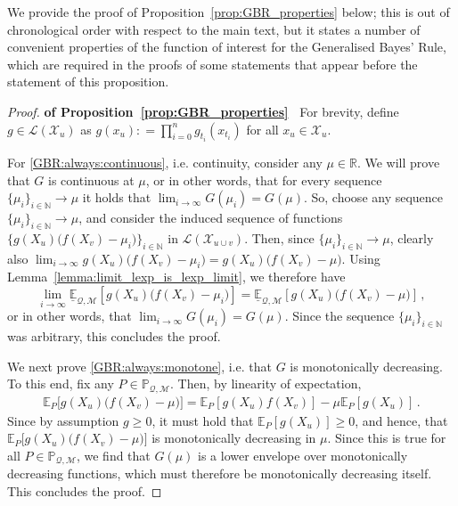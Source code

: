 \documentclass[twoside,11pt]{article}
\newcommand{\nats}{\mathbb{N}}
\newcommand{\reals}{\mathbb{R}}
\newcommand{\states}{\mathcal{X}}
\newcommand{\lexp}{\underline{\mathbb{E}}_{\rateset,\mathcal{M}}}
\newcommand{\gambles}{\mathcal{L}}
\newcommand{\rateset}{\mathcal{Q}}
\newcommand{\coloneqq}{:\!=}
\begin{document}
We provide the proof of Proposition~\ref{prop:GBR_properties} below; this is out of chronological order with respect to the main text, but it states a number of convenient properties of the function of interest for the Generalised Bayes' Rule, which are required in the proofs of some statements that appear before the statement of this proposition.

\begin{proof}{\bf of Proposition~\ref{prop:GBR_properties}~}
For brevity, define $g\in\gambles(\states_u)$ as $g(x_u)\coloneqq \prod_{i=0}^n g_{t_i}(x_{t_i})$ for all $x_u\in\states_u$.

For \ref{GBR:always:continuous}, i.e. continuity, consider any $\mu\in\reals$. We will prove that $G$ is continuous at $\mu$, or in other words, that for every sequence $\{\mu_i\}_{i\in\nats}\to\mu$ it holds that $\lim_{i\to\infty}G(\mu_i)=G(\mu)$. So, choose any sequence $\{\mu_i\}_{i\in\nats}\to\mu$, and consider the induced sequence of functions $\bigl\{g(X_u)\bigl(f(X_v) - \mu_i\bigr)\bigr\}_{i\in\nats}$ in $\gambles(\states_{u\cup v})$. Then, since $\{\mu_i\}_{i\in\nats}\to\mu$, clearly also $\lim_{i\to\infty}g(X_u)\bigl(f(X_v) - \mu_i\bigr)=g(X_u)\bigl(f(X_v) - \mu\bigr)$. Using Lemma~\ref{lemma:limit_lexp_is_lexp_limit}, we therefore have
\begin{equation*}
\lim_{i\to\infty}\lexp[g(X_u)\bigl(f(X_v) - \mu_i\bigr)] = \lexp[g(X_u)\bigl(f(X_v) - \mu\bigr)]\,,
\end{equation*}
or in other words, that $\lim_{i\to\infty}G(\mu_i) = G(\mu)$. Since the sequence $\{\mu_i\}_{i\in\nats}$ was arbitrary, this concludes the proof.

We next prove \ref{GBR:always:monotone}, i.e. that $G$ is monotonically decreasing. To this end, fix any $P\in\mathbb{P}_{\rateset,\mathcal{M}}$. Then, by linearity of expectation,
\begin{align}\label{eq:gbr_linear_expansion}
\mathbb{E}_P\bigl[g(X_u)\bigl(f(X_v) - \mu\bigr)\bigr] = \mathbb{E}_P[g(X_u)f(X_v)] - \mu\mathbb{E}_P[g(X_u)]\,.
\end{align}
Since by assumption $g\geq 0$, it must hold that $\mathbb{E}_P[g(X_u)]\geq 0$, and hence, that $\mathbb{E}_P\bigl[g(X_u)\bigl(f(X_v) - \mu\bigr)\bigr]$ is monotonically decreasing in $\mu$. Since this is true for all $P\in\mathbb{P}_{\rateset,\mathcal{M}}$, we find that $G(\mu)$ is a lower envelope over monotonically decreasing functions, which must therefore be monotonically decreasing itself. This concludes the proof.


\end{proof}
\end{document}
